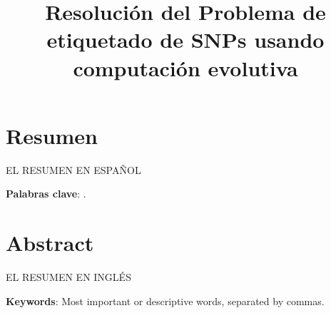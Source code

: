 \documentclass[minitoc, hidelinks, headlogo, framedcover]{tfeEPCC}
\title{Resolución del Problema de etiquetado de SNPs usando computación evolutiva}
\begin{document}
\sloppy 
\pagebreak 


\pagestyle{empty}




\chapter*{Resumen}
EL RESUMEN EN ESPAÑOL

\noindent\textbf{Palabras clave}: \printkeywords.

\chapter*{Abstract}
EL RESUMEN EN INGLÉS

\noindent\textbf{Keywords}: Most important or descriptive words, separated by commas.

\newpage
\pagestyle{plain}
\setcounter{page}{1}
\tableofcontents
\newpage
\listoftables
\newpage
\listoffigures
\newpage
\end{document}
